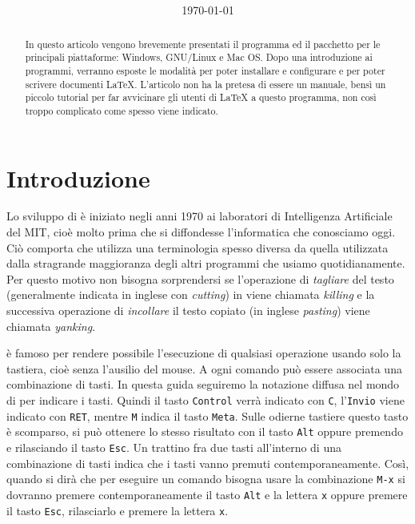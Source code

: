 \documentclass[11pt,a4paper]{article}
\title{\sffamily\bfseries\titolo}
\author{\autorea \and \autoreb \and \autorec}
\date{\today}
\begin{document}
\maketitle
\begin{abstract}
  \noindent In questo articolo vengono brevemente presentati il programma
  \emacs{} ed il pacchetto \auctex{} per le principali piattaforme: Windows,
  GNU/Linux e Mac OS. Dopo una introduzione ai programmi, verranno esposte le
  modalità per poter installare e configurare \emacs{} e \auctex{} per poter
  scrivere documenti \LaTeX{}. L'articolo non ha la pretesa di essere un
  manuale, bensì un piccolo tutorial per far avvicinare gli utenti di \LaTeX{} a
  questo programma, non così troppo complicato come spesso viene indicato.
\end{abstract}

\begin{multicols}{2}
  \tableofcontents
\end{multicols}

\section{Introduzione}
\label{sec:intro}



\textcolor{red}{\lipsum[1]}

Lo sviluppo di \emacs{} è iniziato negli anni 1970 ai laboratori di Intelligenza
Artificiale del MIT, cioè molto prima che si diffondesse l'informatica che
conosciamo oggi.  Ciò comporta che \emacs{} utilizza una terminologia spesso
diversa da quella utilizzata dalla stragrande maggioranza degli altri programmi
che usiamo quotidianamente.  Per questo motivo non bisogna sorprendersi se
l'operazione di \emph{tagliare} del testo (generalmente indicata in inglese con
\emph{cutting}) in \emacs{} viene chiamata \emph{killing} e la successiva
operazione di \emph{incollare} il testo copiato (in inglese \emph{pasting})
viene chiamata \emph{yanking}.

\emacs{} è famoso per rendere possibile l'esecuzione di qualsiasi operazione
usando solo la tastiera, cioè senza l'ausilio del mouse.  A ogni comando può
essere associata una combinazione di tasti.  In questa guida seguiremo la
notazione diffusa nel mondo di \emacs{} per indicare i tasti.  Quindi il tasto
\verb!Control! verrà indicato con \verb!C!, l'\verb!Invio! viene indicato con
\verb!RET!, mentre \verb!M! indica il tasto \verb!Meta!.  Sulle odierne tastiere
questo tasto è scomparso, si può ottenere lo stesso risultato con il tasto
\verb!Alt! oppure premendo e rilasciando il tasto \verb!Esc!.  Un trattino fra
due tasti all'interno di una combinazione di tasti indica che i tasti vanno
premuti contemporaneamente.  Così, quando si dirà che per eseguire un comando
bisogna usare la combinazione \verb!M-x! si dovranno premere contemporaneamente
il tasto \verb!Alt! e la lettera \verb!x! oppure premere il tasto \verb!Esc!,
rilasciarlo e premere la lettera \verb!x!.
\end{document}
